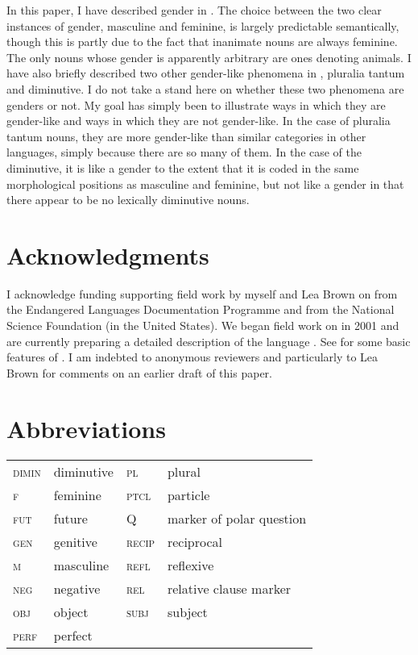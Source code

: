 \documentclass[output=collectionpaper]{langsci/langscibook}
\begin{document}
In this paper, I have described gender in . The choice between the two clear instances of gender, masculine and feminine, is largely predictable semantically, though this is partly due to the fact that inanimate nouns are always feminine. The only nouns whose gender is apparently arbitrary are ones denoting animals. I have also briefly described two other gender-like phenomena in , pluralia tantum and diminutive. I do not take a stand here on whether these two phenomena are genders or not. My goal has simply been to illustrate ways in which they are gender-like and ways in which they are not gender-like. In the case of pluralia tantum nouns, they are more gender-like than similar categories in other languages, simply because there are so many of them. In the case of the diminutive, it is like a gender to the extent that it is coded in the same morphological positions as masculine and feminine, but not like a gender in that there appear to be no lexically diminutive nouns.

\section*{Acknowledgments}
I acknowledge funding supporting field work by myself and Lea Brown on  from the Endangered Languages Documentation Programme and from the National Science Foundation (in the United States). We began field work on  in 2001 and are currently preparing a detailed description of the language \citep{DryerInpreparation}. See \citet{Brown2008} for some basic features of . I am indebted to anonymous reviewers and particularly to Lea Brown for comments on an earlier draft of this paper.

\section*{Abbreviations}

\begin{tabular}{llll}
 \textsc{dimin} & diminutive& \textsc{pl} & plural\\
 \textsc{f} & feminine &  \textsc{ptcl} & particle\\
 \textsc{fut} & future&  Q & marker of polar question\\
 \textsc{gen} & genitive&  \textsc{recip} & reciprocal\\
 \textsc{m} & masculine&  \textsc{refl} & reflexive\\
 \textsc{neg} & negative&  \textsc{rel} & relative clause marker\\
 \textsc{obj} & object & \textsc{subj} & subject\\
 \textsc{perf} & perfect\\
\end{tabular}

\printbibliography[heading=subbibliography,notkeyword=this]


\label{lastpage:Dryer}
\end{document}
